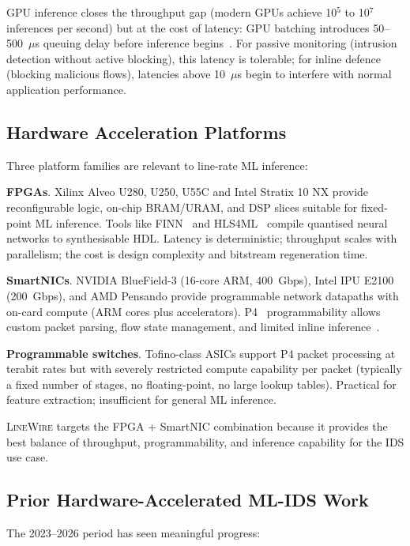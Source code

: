 \documentclass[sigconf,nonacm]{acmart}
\begin{document}
GPU inference closes the throughput gap (modern GPUs achieve 10$^5$ to
10$^7$ inferences per second) but at the cost of latency: GPU
batching introduces 50--500~$\mu$s queuing delay before inference
begins~\cite{nvidiaperf2024}. For passive monitoring (intrusion detection
without active blocking), this latency is tolerable; for inline defence
(blocking malicious flows), latencies above 10~$\mu$s begin to interfere
with normal application performance.

\subsection{Hardware Acceleration Platforms}

Three platform families are relevant to line-rate ML inference:

\textbf{FPGAs}. Xilinx Alveo U280, U250, U55C and Intel Stratix 10 NX
provide reconfigurable logic, on-chip BRAM/URAM, and DSP slices
suitable for fixed-point ML inference. Tools like FINN~\cite{umuroglu2023finn}
and HLS4ML~\cite{hls4ml2024} compile quantised neural networks to
synthesisable HDL. Latency is deterministic; throughput scales with
parallelism; the cost is design complexity and bitstream regeneration time.

\textbf{SmartNICs}. NVIDIA BlueField-3 (16-core ARM, 400~Gbps),
Intel IPU E2100 (200~Gbps), and AMD Pensando provide programmable
network datapaths with on-card compute (ARM cores plus accelerators).
P4~\cite{p4spec} programmability allows custom packet parsing, flow
state management, and limited inline inference~\cite{xiong2025snic}.

\textbf{Programmable switches}. Tofino-class ASICs support P4 packet
processing at terabit rates but with severely restricted compute
capability per packet (typically a fixed number of stages, no
floating-point, no large lookup tables). Practical for feature
extraction; insufficient for general ML inference.

\textsc{LineWire} targets the FPGA + SmartNIC combination because it
provides the best balance of throughput, programmability, and inference
capability for the IDS use case.

\subsection{Prior Hardware-Accelerated ML-IDS Work}

The 2023--2026 period has seen meaningful progress:
\end{document}

